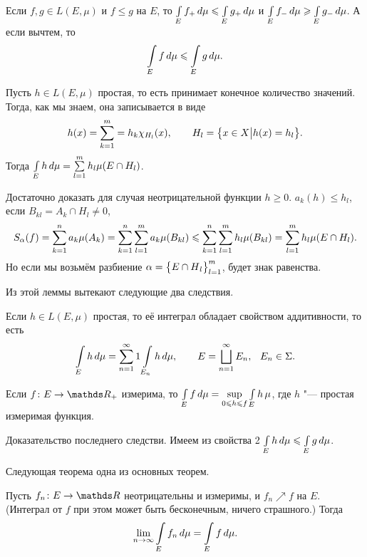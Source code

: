 \begin{Ut}
  Если $f,g\in L(E,\mu)$ и $f\le g$ на $E$, то $\int\limits_{E} f_+\,d\mu \leqslant \int\limits_{E} g_+\,d\mu $ и $\int\limits_{E} f_-\,d\mu\geqslant \int\limits_{E} g_-\,d\mu$. А если вычтем, то
  \[ \int\limits_{E} f\,d\mu\leqslant \int\limits_{E} g\,d\mu.\]
\end{Ut}

\begin{Lem}
  Пусть $h\in L(E,\mu)$ простая, то есть принимает конечное количество значений. Тогда, как мы знаем, она записывается в виде
 \[ 
   h(x) = \sum\limits_{k = 1}^{m} =h_k\chi_{H_l}(x),\qquad H_l=\big\{x\in X\big| h(x)=h_l\big\}.
 \]
  Тогда $\int\limits_{E}h\,d\mu = \sum\limits_{l = 1}^{m} h_l\mu(E\cap H_l)$.
\end{Lem}

\begin{Proof}
  Достаточно доказать для случая неотрицательной функции $h\ge 0$. $a_k(h)\le h_l$, если $B_{kl} = A_k\cap H_l\ne 0$,
  \[
    S_\alpha(f) = \sum\limits_{k = 1}^{n} a_k\mu(A_k) = \sum\limits_{k = 1}^{n}\sum\limits_{l = 1}^{m} a_k\mu(B_{kl})\leqslant \sum\limits_{k = 1}^{n}\sum\limits_{l = 1}^{m} h_l\mu(B_{kl}) = \sum\limits_{l = 1}^{m} h_l\mu(E\cap H_l).
  \]
  Но если мы возьмём разбиение $\alpha = \big\{{E\cap H}_{l}\big\}_{l=1}^{m}$, будет знак равенства.
\end{Proof}

Из этой леммы вытекают следующие два следствия.

\begin{Sl}
  Если $h\in L(E,\mu)$ простая, то её интеграл обладает свойством аддитивности, то есть
  \[
    \int\limits_{E} h\,d\mu = \sum\limits_{{n}={1}}^\infty1\int\limits_{E_n}h\,d\mu,\qquad E = \bigsqcup\limits_{n=1}^\infty E_n,\hskip .75em plus.1em minus.08em\relax E_n\in\Sigma.
  \]
\end{Sl}

\begin{Sl}
  Если $f\colon E\to\R_+$ измерима, то $\int\limits_{E} f\,d\mu = \sup\limits_{0\leqslant h\leqslant f}\int\limits_{E} h\,\mu$, где $h$ "--- простая измеримая функция.
\end{Sl}
 \begin{Proof}
  Доказательство последнего следстви. Имеем из свойства 2 $\int\limits_{E} h\,d\mu\leqslant \int\limits_{E}g\,d\mu$.
\end{Proof}

Следующая теорема одна из основных теорем.
\begin{The}
  Пусть $f_n\colon E\to \R$ неотрицательны и измеримы, и $f_n\nearrow f$ на $E$. (Интеграл от $f$ при этом может быть бесконечным, ничего страшного.) Тогда 
  \[
    \lim\limits_{n\rightarrow\infty}\int\limits_{E}f_n\,d\mu = \int\limits_{E} f\,d\mu.
  \]
\end{The}


